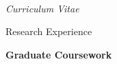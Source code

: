 \documentclass[10pt]{article}
\newenvironment{sublist}{%
	\begin{list}{}{%
		\setlength{\itemsep}{0em}\setlength{\parsep}{0em}%
		\setlength{\topsep}{0em}\setlength{\parskip}{0em}%
	}%
}%
{ \end{list} }
\begin{document}
\begin{cv}{\name\\{\large \itshape Curriculum Vitae}}
\setlength{\cvlabelwidth}{\oldcvlabelwidth}

\setlength{\oldcvlabelwidth}{\cvlabelwidth}
\setlength{\cvlabelwidth}{1em}
\begin{cvlist}{Research Experience}
	\item \textbf{Graduate Coursework}
	\begin{sublist}
		

\end{sublist}
\end{cvlist}
\end{cv}
\end{document}
